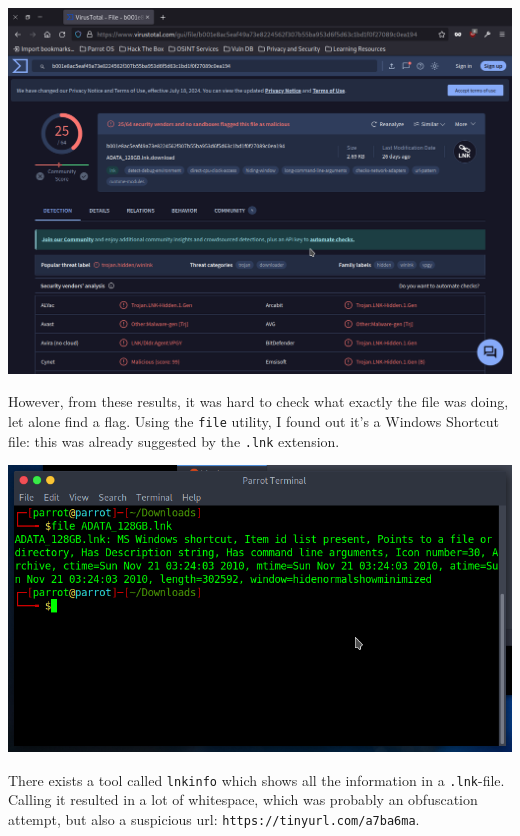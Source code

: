 \documentclass{article}
\begin{document}
\noindent 
\begin{center}
\includegraphics[width=16cm]{usb-drive/screenshot2.png}
\end{center}

\noindent
However, from these results, it was hard to check what exactly the file was doing, let alone find a flag. Using the \texttt{file} utility, I found out it's a Windows Shortcut file: this was already suggested by the \texttt{.lnk} extension.

\noindent 
\begin{center}
\includegraphics[width=16cm]{usb-drive/screenshot1.png}
\end{center}

\noindent
There exists a tool called \texttt{lnkinfo} which shows all the information in a \texttt{.lnk}-file. Calling it resulted in a lot of whitespace, which was probably an obfuscation attempt, but also a suspicious url: \texttt{https://tinyurl.com/a7ba6ma}.
\end{document}
